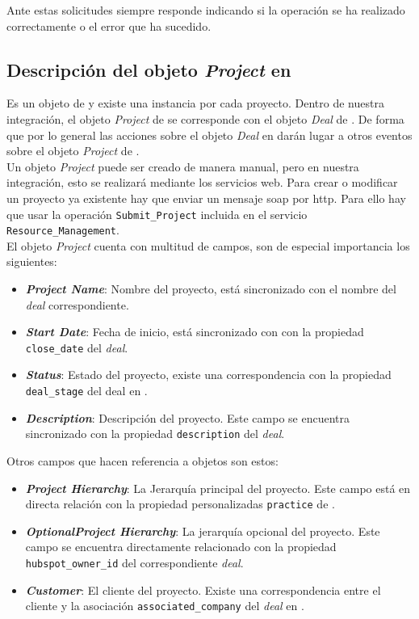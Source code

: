 Ante estas solicitudes \wday{} siempre responde indicando si la operación se ha realizado correctamente o el error que ha sucedido.



\subsection{Descripción del objeto \textit{Project} en \wday{}}
Es un objeto de \wday{} y existe una instancia por cada proyecto. Dentro de nuestra integración, 
el objeto \textit{Project} de \wday{} se corresponde con el objeto \textit{Deal} de \hs{}. 
De forma que por lo general las acciones sobre el objeto \textit{Deal} en \hs{} darán lugar a otros eventos
 sobre el objeto \textit{Project} de \wday{}.\\
 
Un objeto \textit{Project} puede ser creado de manera manual, pero en nuestra integración, esto se realizará mediante los servicios web.
Para crear o modificar un proyecto ya existente hay que enviar un mensaje \acrshort{soap} por \acrshort{http}. 
Para ello hay que usar la operación \texttt{Submit\_Project}  incluida en el servicio \texttt{Resource\_Management}.\\

El objeto \textit{Project} cuenta con multitud de campos, son de especial importancia los siguientes: 

\begin{itemize}
\item \textbf{\textit{Project Name}}: Nombre del proyecto, está sincronizado con el nombre del \textit{deal} correspondiente.
\item \textbf{\textit{Start Date}}: Fecha de inicio, está sincronizado con con la propiedad \texttt{close\_date} del \textit{deal}.
\item \textbf{\textit{Status}}: Estado del proyecto, existe una correspondencia con la propiedad \texttt{deal\_stage} del deal en \hs{}.
\item \textbf{\textit{Description}}: Descripción del proyecto. Este campo se encuentra sincronizado con la propiedad \texttt{description} del \textit{deal}.
\end{itemize}

Otros campos que hacen referencia a objetos son estos: 
\begin{itemize}
\item \textbf{\textit{Project Hierarchy}}: La Jerarquía principal del proyecto. Este campo está en directa relación con la propiedad personalizadas
\texttt{practice} de \hs.
\item \textbf{\textit{OptionalProject Hierarchy}}: La jerarquía opcional del proyecto. Este campo se encuentra directamente relacionado con la propiedad \texttt{hubspot\_owner\_id} del correspondiente \textit{deal}.
\item \textbf{\textit{Customer}}: El cliente del proyecto. Existe una correspondencia entre el cliente y la asociación \texttt{associated\_company} del \textit{deal} en \hs{}.

\end{itemize}



